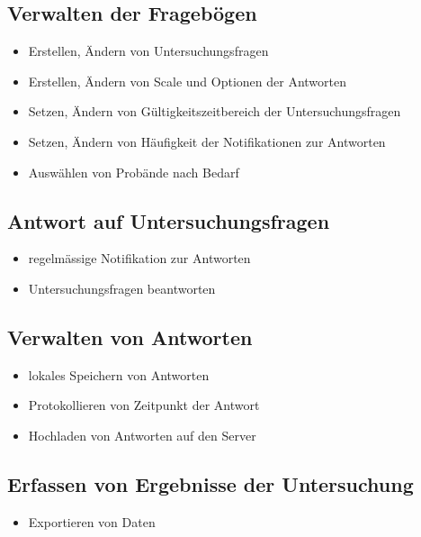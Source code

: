 \documentclass[a4paper]{scrreprt}
\begin{document}
            \subsection{Verwalten der Frageb\"ogen}
                \begin{itemize}
                    \item Erstellen, \"Andern von Untersuchungsfragen
                    \item Erstellen, \"Andern von Scale und Optionen der Antworten
                    \item Setzen, \"Andern von G\"ultigkeitszeitbereich der Untersuchungsfragen
                    \item Setzen, \"Andern von H\"aufigkeit der Notifikationen zur Antworten
                    \item Ausw\"ahlen von Prob\"ande nach Bedarf
                \end{itemize}
            
            \subsection{Antwort auf Untersuchungsfragen}
                \begin{itemize}
                    \item regelm\"assige Notifikation zur Antworten
                    \item Untersuchungsfragen beantworten
                \end{itemize}
                
            \subsection{Verwalten von Antworten}
                \begin{itemize}
                    \item lokales Speichern von Antworten
                    \item Protokollieren von Zeitpunkt der Antwort
                    \item Hochladen von Antworten auf den Server
                \end{itemize}
            
            \subsection{Erfassen von Ergebnisse der Untersuchung}
                \begin{itemize}
                    \item Exportieren von Daten  
                \end{itemize}
 
\end{document}

